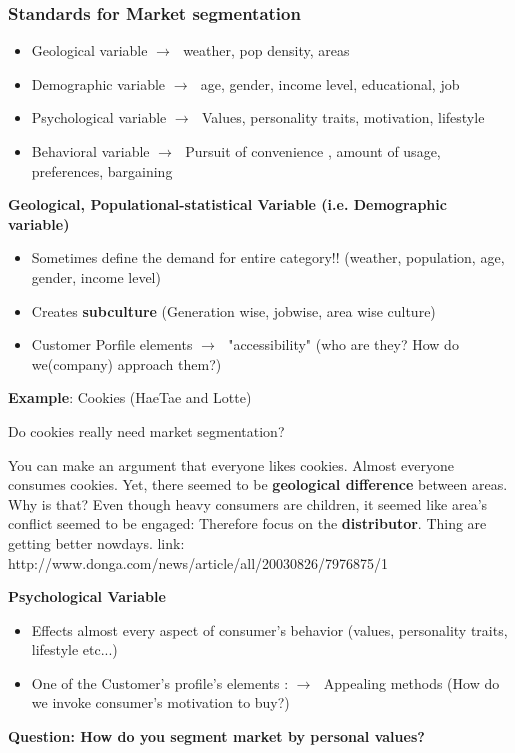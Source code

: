 \documentclass[12pt]{article}
\newcommand{\ra}{$\rightarrow \text{ }$}
\begin{document}
\subsubsection{Standards for Market segmentation}

\begin{itemize}
	\item Geological variable \ra weather, pop density, areas
	\item Demographic variable \ra age, gender, income level, educational, job
	\item Psychological variable \ra Values, personality traits, motivation, lifestyle
	\item Behavioral variable \ra Pursuit of convenience , amount of usage, preferences, bargaining
\end{itemize}

\textbf{Geological, Populational-statistical Variable (i.e. Demographic variable)}

\begin{itemize}
	\item Sometimes define the demand for entire category!! (weather, population, age, gender, income level)
	\item Creates \textbf{subculture} (Generation wise, jobwise, area wise culture)
	\item Customer Porfile elements \ra "accessibility" (who are they? How do we(company) approach them?)
\end{itemize}

\begin{tcolorbox}
	\textbf{Example}: Cookies (HaeTae and Lotte)
	\begin{center}
		Do cookies really need market segmentation?
	\end{center}
	You can make an argument that everyone likes cookies. Almost everyone consumes cookies. Yet, there seemed to be \textbf{geological difference} between areas. Why is that? Even though heavy consumers are children, it seemed like area's conflict seemed to be engaged: Therefore focus on the \textbf{distributor}. Thing are getting better nowdays. link:
	http://www.donga.com/news/article/all/20030826/7976875/1

\end{tcolorbox}

\textbf{Psychological Variable}
\begin{itemize}
	\item Effects almost every aspect of consumer's behavior (values, personality traits, lifestyle etc...)
	\item One of the Customer's profile's elements : \ra Appealing methods (How do we invoke consumer's motivation to buy?)
\end{itemize}
\textbf{Question: How do you segment market by personal values?}
\end{document}
